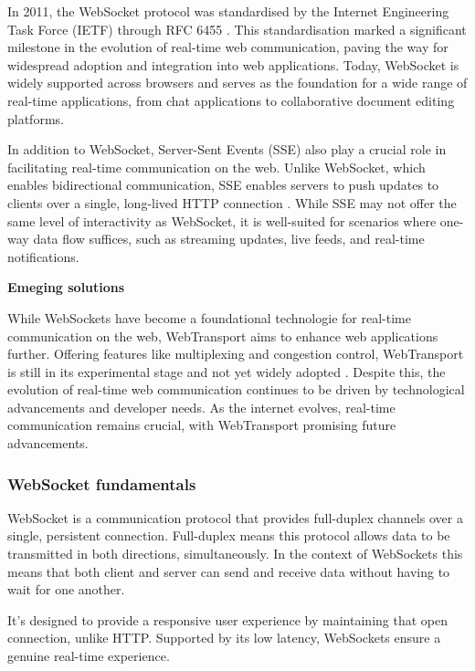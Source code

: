 In 2011, the WebSocket protocol was standardised by the Internet Engineering Task Force (IETF) through RFC 6455 \cite{mdn-ws}. This standardisation marked a significant milestone in the evolution of real-time web communication, paving the way for widespread adoption and integration into web applications. Today, WebSocket is widely supported across browsers and serves as the foundation for a wide range of real-time applications, from chat applications to collaborative document editing platforms.

In addition to WebSocket, Server-Sent Events (SSE) also play a crucial role in facilitating real-time communication on the web. Unlike WebSocket, which enables bidirectional communication, SSE enables servers to push updates to clients over a single, long-lived HTTP connection \cite{mdn-sse}. While SSE may not offer the same level of interactivity as WebSocket, it is well-suited for scenarios where one-way data flow suffices, such as streaming updates, live feeds, and real-time notifications.

\textbf{Emeging solutions}

While WebSockets have become a foundational technologie for real-time communication on the web, WebTransport aims to enhance web applications further. Offering features like multiplexing and congestion control, WebTransport is still in its experimental stage and not yet widely adopted \cite{mdn-wt}. Despite this, the evolution of real-time web communication continues to be driven by technological advancements and developer needs. As the internet evolves, real-time communication remains crucial, with WebTransport promising future advancements.

\subsubsection{WebSocket fundamentals}

WebSocket is a communication protocol that provides full-duplex channels over a single, persistent connection. Full-duplex means this protocol allows data to be transmitted in both directions, simultaneously. In the context of WebSockets this means that both client and server can send and receive data without having to wait for one another.

It's designed to provide a responsive user experience by maintaining that open connection, unlike HTTP. Supported by its low latency, WebSockets ensure a genuine real-time experience. \cite{ws-rfc}

